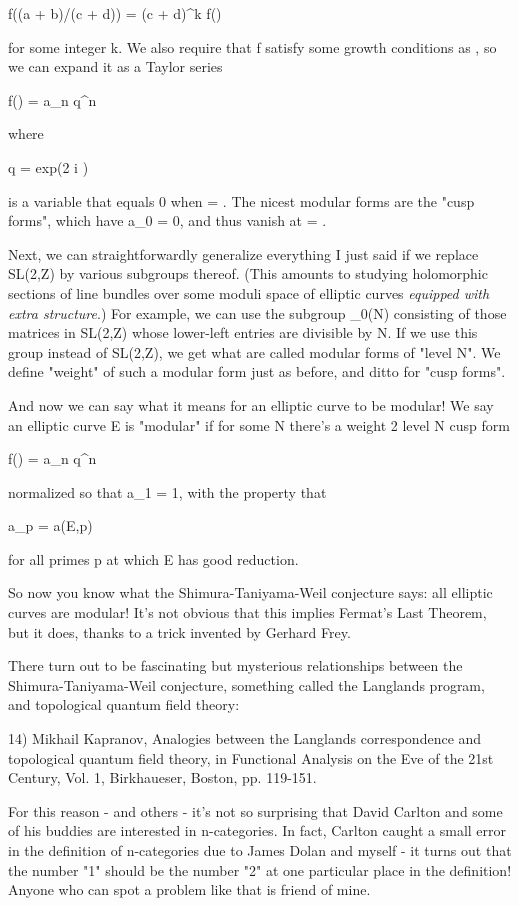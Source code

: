 f((a \tau  + b)/(c \tau  + d)) = (c \tau  + d)^{k} f(\tau )

for some integer k.   We also require that f satisfy some growth 
conditions as \tau  \to  \infty , so we can expand it as a Taylor series

f(\tau ) = \sum a_{n} q^{n}

where 

q = exp(2 \pi  i \tau )

is a variable that equals 0 when \tau  = \infty .  The nicest modular
forms are the "cusp forms", which have a_{0} = 0,
and thus vanish at \tau  = \infty .

Next, we can straightforwardly generalize everything I just said if we
replace SL(2,Z) by various subgroups thereof.  (This amounts to
studying holomorphic sections of line bundles over some moduli space
of elliptic curves \emph{equipped with extra structure}.)  For
example, we can use the subgroup \Gamma _{0}(N) consisting of those
matrices in SL(2,Z) whose lower-left entries are divisible by N.  If
we use this group instead of SL(2,Z), we get what are called modular
forms of "level N".  We define "weight" of such a
modular form just as before, and ditto for "cusp forms".

And now we can say what it means for an elliptic curve to be modular!
We say an elliptic curve E is "modular" if for some N
there's a weight 2 level N cusp form

f(\tau ) = \sum a_{n} q^{n}

normalized so that a_{1} = 1, with the property that

a_{p} = a(E,p)

for all primes p at which E has good reduction.  

So now you know what the Shimura-Taniyama-Weil conjecture says:
all elliptic curves are modular!  It's not obvious that this implies
Fermat's Last Theorem, but it does, thanks to a trick invented by
Gerhard Frey.

There turn out to be fascinating but mysterious relationships between
the Shimura-Taniyama-Weil conjecture, something called the Langlands
program, and topological quantum field theory:

14) Mikhail Kapranov, Analogies between the Langlands correspondence
and topological quantum field theory, in Functional Analysis on the 
Eve of the 21st Century, Vol. 1, Birkhaueser, Boston, pp. 119-151.

For this reason - and others - it's not so surprising that David
Carlton and some of his buddies are interested in n-categories.  In
fact, Carlton caught a small error in the definition of n-categories
due to James Dolan and myself - it turns out that the number
"1" should be the number "2" at one particular
place in the definition!  Anyone who can spot a problem like that is
friend of mine.

